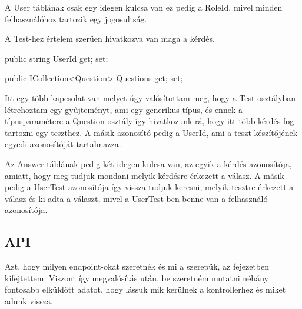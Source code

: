 A User táblának csak egy idegen kulcsa van ez pedig a RoleId, mivel minden felhasználóhoz tartozik egy jogosultság.\newline


A Test-hez értelem szerűen hivatkozva van maga a kérdés.
\begin{cpp}
    public string UserId { get; set; }

    public ICollection<Question> Questions { get; set; }
\end{cpp}
Itt egy-több kapcsolat van melyet úgy valósítottam meg, hogy a Test osztályban létrehoztam egy gyűjteményt, ami egy generikus típus, és ennek a típusparamétere a Question osztály így hivatkozunk rá, hogy itt több kérdés fog tartozni egy teszthez. A másik azonosító pedig a UserId, ami a teszt készítőjének egyedi azonosítóját tartalmazza. \newline

Az Answer táblának pedig két idegen kulcsa van, az egyik a kérdés azonosítója, amiatt, hogy meg tudjuk mondani melyik kérdésre érkezett a válasz. A másik pedig a UserTest azonosítója így vissza tudjuk keresni,  melyik tesztre érkezett a válasz és ki adta a választ, mivel a UserTest-ben benne van a felhasználó azonosítója.

\subsection{API}

Azt, hogy milyen endpoint-okat szeretnék és mi a szerepük, az  fejezetben kifejtettem. Viszont így megvalósítás után, be szeretném mutatni néhány fontosabb elküldött adatot, hogy lássuk mik kerülnek a kontrollerhez és miket adunk vissza. 

